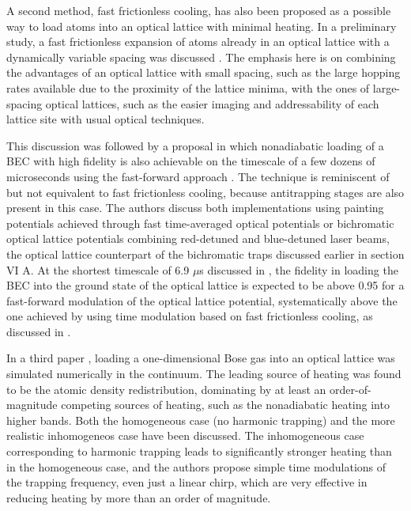 \documentclass[pra,letterpaper,twocolumn,showpacs,superscriptaddress]{revtex4}
\begin{document}
A second method, fast frictionless cooling, has also been proposed as a possible way to load atoms into an optical lattice with minimal heating. 
In a preliminary study, a fast frictionless expansion of atoms already in an optical lattice with a dynamically variable spacing was discussed \cite{Yuce2012}. 
The emphasis here is on combining the advantages of an optical lattice with small spacing, such as the large hopping rates available due to the proximity of 
the lattice minima, with the ones of large-spacing optical lattices, such as the easier imaging and addressability of each lattice site with usual optical techniques. 

This discussion was followed by a proposal \cite{Masuda2014} in which nonadiabatic loading of a BEC with high fidelity is also achievable 
on the timescale of a few dozens of microseconds using the fast-forward approach \cite{Masuda2008,Masuda2010,Masuda2011}. 
The technique is reminiscent of but not equivalent to fast frictionless cooling, because antitrapping stages are also present in this case. 
The authors discuss both implementations using painting potentials achieved through fast time-averaged optical potentials 
\cite{Onofrio2000b,Milner2001,Friedman2001,Henderson2009} or bichromatic optical lattice potentials combining 
red-detuned and blue-detuned laser beams, the optical lattice counterpart of the bichromatic traps discussed earlier in section VI A. 
At the shortest timescale of 6.9 $\mu$s discussed in \cite{Masuda2014}, the fidelity in loading the BEC into the ground state of the 
optical lattice is expected to be above 0.95 for a fast-forward modulation of the optical lattice potential, systematically above the one achieved by using time modulation based on fast frictionless cooling, as discussed in \cite{Yuce2012}.

In a third paper \cite{Dolfi2015}, loading a one-dimensional Bose gas into an optical lattice was simulated numerically in the continuum. The leading source of heating was 
found to be the atomic density redistribution, dominating by at least an order-of-magnitude competing sources of heating, such as the nonadiabatic heating into higher bands. 
Both the homogeneous case (no harmonic trapping) and the more realistic inhomogeneos case have been discussed. The inhomogeneous case corresponding to harmonic trapping leads to 
significantly stronger heating than in the homogeneous case, and the authors propose simple time modulations of the trapping frequency, even just a linear chirp, which
are very effective in reducing heating by more than an order of magnitude. 
\end{document}

